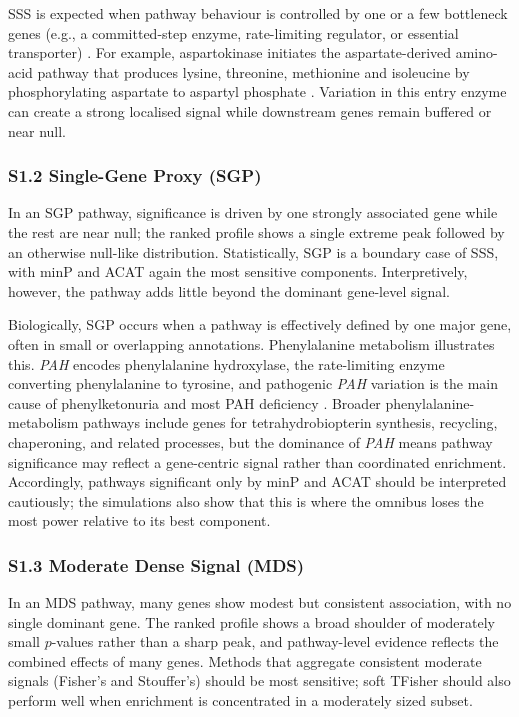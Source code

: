 SSS is expected when pathway behaviour is controlled by one or a few bottleneck genes (e.g., a committed-step enzyme, rate-limiting regulator, or essential transporter) \citep{MorenoSanchez2008,Naz2023,Tanner2018,Song2020}. For example, aspartokinase initiates the aspartate-derived amino-acid pathway that produces lysine, threonine, methionine and isoleucine \citep{Galili2011} by phosphorylating aspartate to aspartyl phosphate \citep{Hasenoehrl2019}. Variation in this entry enzyme can create a strong localised signal while downstream genes remain buffered or near null.

\subsubsection*{S1.2 Single-Gene Proxy (SGP)}

In an SGP pathway, significance is driven by one strongly associated gene while the rest are near null; the ranked profile shows a single extreme peak followed by an otherwise null-like distribution. Statistically, SGP is a boundary case of SSS, with minP and ACAT again the most sensitive components. Interpretively, however, the pathway adds little beyond the dominant gene-level signal.

Biologically, SGP occurs when a pathway is effectively defined by one major gene, often in small or overlapping annotations. Phenylalanine metabolism illustrates this. \textit{PAH} encodes phenylalanine hydroxylase, the rate-limiting enzyme converting phenylalanine to tyrosine, and pathogenic \textit{PAH} variation is the main cause of phenylketonuria and most PAH deficiency \citep{Flydal2013PAH,Elhawary2022PKU}. Broader phenylalanine-metabolism pathways include genes for tetrahydrobiopterin synthesis, recycling, chaperoning, and related processes, but the dominance of \textit{PAH} means pathway significance may reflect a gene-centric signal rather than coordinated enrichment. Accordingly, pathways significant only by minP and ACAT should be interpreted cautiously; the simulations also show that this is where the omnibus loses the most power relative to its best component.

\subsubsection*{S1.3 Moderate Dense Signal (MDS)}

In an MDS pathway, many genes show modest but consistent association, with no single dominant gene. The ranked profile shows a broad shoulder of moderately small $p$-values rather than a sharp peak, and pathway-level evidence reflects the combined effects of many genes. Methods that aggregate consistent moderate signals (Fisher’s and Stouffer’s) should be most sensitive; soft TFisher should also perform well when enrichment is concentrated in a moderately sized subset.

